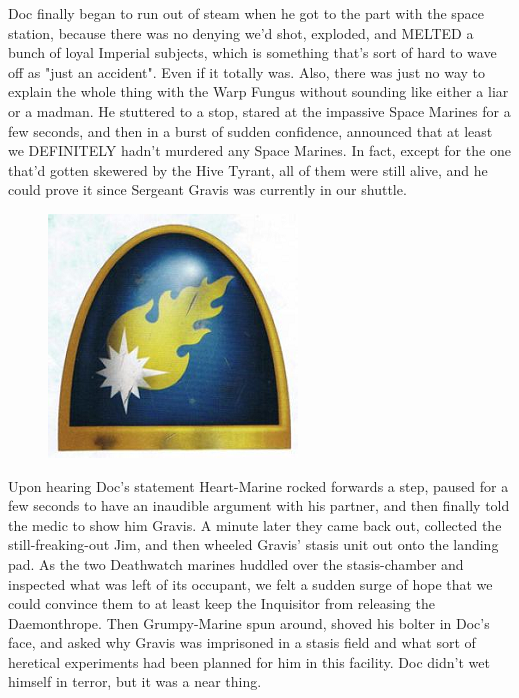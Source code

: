 Doc finally began to run out of steam when he got to the part with the space station, because there was no denying we'd shot, exploded, and MELTED a bunch of loyal Imperial subjects, which is something that's sort of hard to wave off as "just an accident". 
Even if it totally was. 
Also, there was just no way to explain the whole thing with the Warp Fungus without sounding like either a liar or a madman. 
He stuttered to a stop, stared at the impassive Space Marines for a few seconds, and then in a burst of sudden confidence, announced that at least we DEFINITELY hadn't murdered any Space Marines. 
In fact, except for the one that'd gotten skewered by the Hive Tyrant, all of them were still alive, and he could prove it since Sergeant Gravis was currently in our shuttle.

\begin{figure}
	\begin{center}
		\includegraphics[width=\figwidth]{pics/16/11.png}
	\end{center}
\end{figure}
Upon hearing Doc's statement Heart-Marine rocked forwards a step, paused for a few seconds to have an inaudible argument with his partner, and then finally told the medic to show him Gravis. 
A minute later they came back out, collected the still-freaking-out Jim, and then wheeled Gravis' stasis unit out onto the landing pad. 
As the two Deathwatch marines huddled over the stasis-chamber and inspected what was left of its occupant, we felt a sudden surge of hope that we could convince them to at least keep the Inquisitor from releasing the Daemonthrope. 
Then Grumpy-Marine spun around, shoved his bolter in Doc's face, and asked why Gravis was imprisoned in a stasis field and what sort of heretical experiments had been planned for him in this facility. 
Doc didn't wet himself in terror, but it was a near thing.

